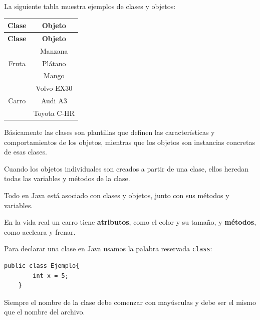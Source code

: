 \documentclass[12pt]{article}
\theoremstyle{largebreak}
\begin{document}
    \begin{exa}
        La siguiente tabla muestra ejemplos de clases y objetos:
        \begin{longtable}{c c}
            \toprule
            \toprule
            \textbf{Clase} & \textbf{Objeto} \\
            \midrule
            \midrule
            \endfirsthead
            
            \midrule
            \midrule
            \textbf{Clase} & \textbf{Objeto} \\
            \midrule
            \midrule
            \endhead
            
             \multirow{3}{*}{Fruta} & Manzana \\  
            & Plátano \\
            & Mango \\
            \hline

            \multirow{3}{*}{Carro} & Volvo EX30 \\  
            & Audi A3 \\
            & Toyota C-HR \\

            \bottomrule
            \bottomrule
        \end{longtable}
        Básicamente las clases son plantillas que definen las características y comportamientos de los objetos, mientras que los objetos son instancias concretas de esas clases.
    \end{exa}

    Cuando los objetos individuales son creados a partir de una clase, ellos heredan todas las variables y métodos de la clase.

    \begin{obs}
        Todo en Java está asociado con clases y objetos, junto con sus métodos y variables.
    \end{obs}
    
    En la vida real un carro tiene \textbf{atributos}, como el color y su tamaño, y \textbf{métodos}, como aceleara y frenar.

    \begin{obs}
        Para declarar una clase en Java usamos la palabra reservada \lstinline|class|:
        \begin{lstlisting}[caption={Declaración de Clase en Java.},label=DescriptiveLabel]
    public class Ejemplo{
        int x = 5;
    }
        \end{lstlisting}
        Siempre el nombre de la clase debe comenzar con mayúsculas y debe ser el mismo que el nombre del archivo.
    \end{obs}
\end{document}

